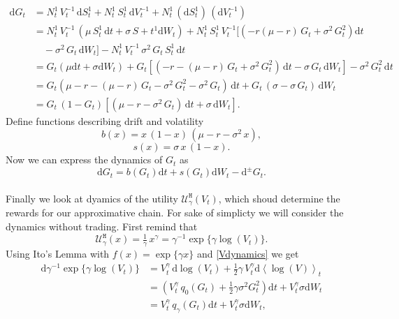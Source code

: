 \begin{align*}
\mathrm{d} G_t&=N_t^1\,V_t^{-1}\,\mathrm{d}S_t^1+N_t^1\,S_t^1\,\mathrm{d}V_t^{-1}+N_t^1\,(\mathrm{d}S_t^1)\,(\mathrm{d}V_t^{-1})\\
&=N_t^1\,V_t^{-1}\,(\mu\,S_t^1\,\mathrm{d}t+\sigma\,S+t^1 \mathrm{d}W_t) + N_t^1\,S_t^1\,V_t^{-1}[(-r(\mu-r)\,G_t+\sigma^2\,G_t^2)\mathrm{d}t\\ 
&\quad -\sigma^2\,G_t\,\mathrm{d}W_t]-N_t^1\,V_t^{-1}\,\sigma^2\,G_t\,S_t^1\,\mathrm{d}t  \\
&=G_t(\mu\mathrm{d}t+\sigma\mathrm{d}W_t)+G_t[(-r-(\mu-r)\,G_t+\sigma^2\,G_t^2)\,\mathrm{d}t-\sigma\,G_t\,\mathrm{d}W_t]-\sigma^2\,G_t^2\,\mathrm{d}t\\
&=G_t(\mu-r-(\mu-r)\,G_t-\sigma^2\,G_t^2-\sigma^2\,G_t)\,\mathrm{d}t + G_t\,(\sigma-\sigma\,G_t)\,\mathrm{d}W_t\\
&=G_t\,(1-G_t)[(\mu-r-\sigma^2\,G_t)\,\mathrm{d}t + \sigma\,\mathrm{d}W_t].
\end{align*}
Define functions describing drift and volatility
\[b(x)=x\,(1-x)\,(\mu-r-\sigma^2\,x),\]
\[s(x)=\sigma\,x\,(1-x).\]
Now we can express the dynamics of $G_t$ as
\begin{equation}
\label{position}
\mathrm{d}G_t=b(G_t)\mathrm{d}t+s(G_t)\mathrm{d}W_t-\mathrm{d}^{\pm} G_t.
\end{equation}
\\
Finally we look at dyamics of the utility $\mathcal{U}^{\texttt{H}}_{\gamma}(V_t)$, which shoud determine the rewards for our approximative chain. For sake of simplicty we will consider the dynamics without trading. First remind that
\begin{equation}
\label{eq21}
\mathcal{U}^{\texttt{H}}_{\gamma}(x)=\tfrac{1}{\gamma}\,x^{\gamma}=\gamma^{-1}\exp\{\gamma\log(V_t)\}.
\end{equation}
Using Ito's Lemma with $f(x)=\exp\{\gamma x\}$ and \eqref{Vdynamics} we get %
\begin{equation}
\label{eq22}
\begin{split}
\mathrm{d}\gamma^{-1}\exp\{\gamma \log(V_t)\}&=V_t^{\gamma}\,\mathrm{d}\log(V_t)+\tfrac{1}{2}\gamma\,V_t^{\gamma}\mathrm{d}\left\langle \log(V) \right\rangle_t\\
&=(V_t^{\gamma}\,q_0(G_t)+\tfrac{1}{2}\gamma\sigma^2 G_t^2) \mathrm{d}t + V_t^{\gamma}\sigma \mathrm{d}W_t\\
&=V_t^{\gamma}\,q_{\gamma}(G_t)\mathrm{d}t + V_t^{\gamma}\sigma \mathrm{d}W_t,\\
\end{split}
\end{equation}
